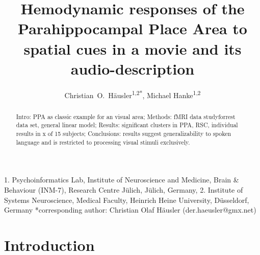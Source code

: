 \documentclass[english]{article}
\begin{document}




\title{Hemodynamic responses of the Parahippocampal Place Area to spatial cues in a movie and its audio-description}

\author{Christian~O.~Häusler\textsuperscript{1,2{*}}, Michael
Hanke\textsuperscript{1,2}}

\maketitle
\thispagestyle{fancy}

1. Psychoinformatics Lab, Institute of Neuroscience and Medicine, Brain \&
Behaviour (INM-7), Research Centre Jülich, Jülich, Germany, 2. Institute of
Systems Neuroscience, Medical Faculty, Heinrich Heine University,  Düsseldorf,
Germany {*}corresponding author: Christian Olaf Häusler (der.haeusler@gmx.net)

\begin{abstract}
Intro: PPA as classic example for an visual area; Methods: fMRI data
studyforrest data set, general linear model; Results: significant clusters in
PPA, RSC, individual results in x of 15 subjects; Conclusions: results suggest
generalizability to spoken language and is restricted to processing visual
stimuli exclusively. \end{abstract}




\section{Introduction}

\end{document}
